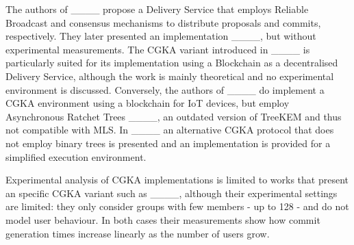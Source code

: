 The authors of ____ propose a Delivery Service that employs Reliable Broadcast and consensus mechanisms to distribute proposals and commits, respectively. They later presented an implementation ____, but without experimental measurements. The CGKA variant introduced in ____ is particularly suited for its implementation using a Blockchain as a decentralised Delivery Service, although the work is mainly theoretical and no experimental environment is discussed. Conversely, the authors of ____ do implement a CGKA environment using a blockchain for IoT devices, but employ Asynchronous Ratchet Trees ____, an outdated version of TreeKEM and thus not compatible with MLS. In ____ an alternative CGKA protocol that does not employ binary trees is presented and an implementation is provided for a simplified execution environment. 

Experimental analysis of CGKA implementations is limited to works that present an specific CGKA variant such as ____, although their experimental settings are limited: they only consider groups with few members - up to 128 - and do not model user behaviour. In both cases their measurements show how commit generation times increase linearly as the number of users grow.